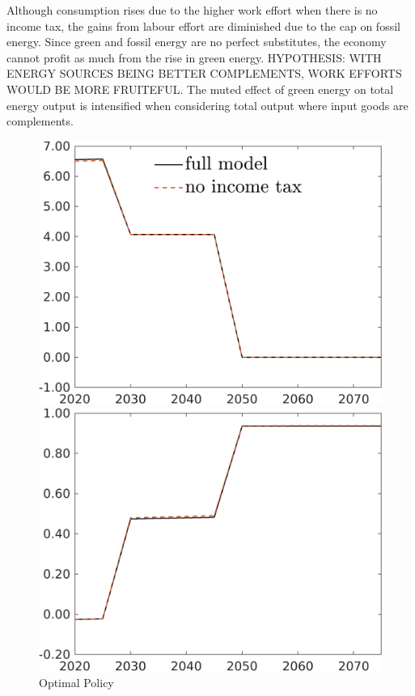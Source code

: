 Although consumption rises due to the higher work effort when there is no income tax, the gains from labour effort are diminished due to the cap on fossil energy. Since green and fossil energy are no perfect substitutes, the economy cannot profit as much from the rise in green energy. HYPOTHESIS: WITH ENERGY SOURCES BEING BETTER COMPLEMENTS, WORK EFFORTS WOULD BE MORE FRUITEFUL. The muted effect of green energy on total energy output is intensified when considering total output where input goods are complements. 

\begin{figure}[h!!]
	\centering
	\caption{Optimal Policy }\label{fig:Compno_taul}
			\begin{minipage}[]{0.32\textwidth}
		\includegraphics[width=1\textwidth]{../../codding_model/own_basedOnFried/optimalPol_elastS_DisuSci/figures/all_1705/comp_notaul_OPT_T_NoTaus_Emnet_spillover0_sep1_BN0_ineq0_etaa0.79_lgd1.png}
	\end{minipage}
		\begin{minipage}[]{0.32\textwidth}
		\includegraphics[width=1\textwidth]{../../codding_model/own_basedOnFried/optimalPol_elastS_DisuSci/figures/all_1705/comp_notaul_OPT_T_NoTaus_tauf_spillover0_sep1_BN0_ineq0_etaa0.79.png}

\end{minipage}
\end{figure}
